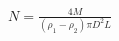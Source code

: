 \documentclass[preview]{standalone}
\begin{document}
\begin{align*}
N = \tfrac{4M}{(\rho_1-\rho_2)\pi D^2 L}
\end{align*}
\end{document}
